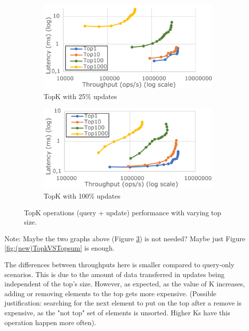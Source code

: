 \documentclass[sigplan,10pt]{acmart}
\begin{document}
\begin{figure}[h]
	\centering
	\begin{subfigure}{.5\linewidth}
		\centering
		\includegraphics[width=.97\linewidth]{TopKTopSize25upd_cut}
		\caption{TopK with 25\% updates}
		\label{fig:(new)TopkSize25upd}
	\end{subfigure}%
	\begin{subfigure}{.5\linewidth}
		\centering
		\includegraphics[width=.97\linewidth]{TopKTopSize100upd_cut}
		\caption{TopK with 100\% updates}
		\label{fig:(new)TopkSize100upd}
	\end{subfigure}
	\caption{TopK operations (query + update) performance with varying top size.}
	\label{fig:(new)TopkSize25_100upd}
\end{figure}

Note: Maybe the two graphs above (Figure \ref{fig:(new)TopkSize25_100upd}) is not needed? Maybe just Figure \ref{fig:(new)TopkVSTopsum} is enough.

The differences between throughputs here is smaller compared to query-only scenarios.
This is due to the amount of data transferred in updates being independent of the top's size.
However, as expected, as the value of K increases, adding or removing elements to the top gets more expensive.
(Possible justification: searching for the next element to put on the top after a remove is expensive, as the "not top" set of elements is unsorted. Higher Ks have this operation happen more often).
\end{document}

